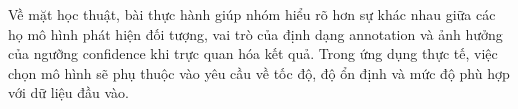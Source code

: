\documentclass[12pt,a4paper]{article}
\begin{document}
Về mặt học thuật, bài thực hành giúp nhóm hiểu rõ hơn sự khác nhau giữa các họ mô hình phát hiện đối tượng, vai trò của định dạng annotation và ảnh hưởng của ngưỡng confidence khi trực quan hóa kết quả. Trong ứng dụng thực tế, việc chọn mô hình sẽ phụ thuộc vào yêu cầu về tốc độ, độ ổn định và mức độ phù hợp với dữ liệu đầu vào.
\end{document}
